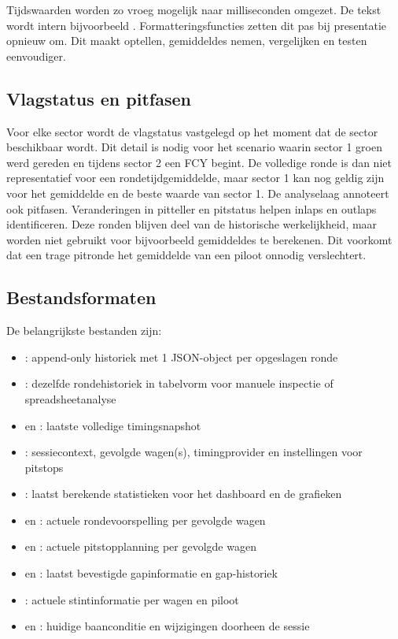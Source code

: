 Tijdswaarden worden zo vroeg mogelijk naar milliseconden omgezet. De tekst  wordt
intern bijvoorbeeld . Formatteringsfuncties zetten dit pas bij presentatie
opnieuw om. Dit maakt optellen, gemiddeldes nemen, vergelijken en testen eenvoudiger.

\subsection{Vlagstatus en pitfasen}
Voor elke sector wordt de vlagstatus vastgelegd op het moment dat de sector beschikbaar wordt. Dit
detail is nodig voor het scenario waarin sector 1 groen werd gereden en tijdens sector 2 een FCY
begint. De volledige ronde is dan niet representatief voor een rondetijdgemiddelde, maar sector 1
kan nog geldig zijn voor het gemiddelde en de beste waarde van sector 1.
De analyselaag annoteert ook pitfasen. Veranderingen in pitteller en pitstatus helpen inlaps en
outlaps identificeren. Deze ronden blijven deel van de historische werkelijkheid, maar worden niet
gebruikt voor bijvoorbeeld gemiddeldes te berekenen. Dit voorkomt dat een trage pitronde het gemiddelde van een
piloot onnodig verslechtert.

\subsection{Bestandsformaten}
De belangrijkste bestanden zijn:

\begin{itemize}
  \item {}: append-only historiek met 1 JSON-object per opgeslagen ronde
  \item {}: dezelfde rondehistoriek in tabelvorm voor manuele inspectie of spreadsheetanalyse
  \item {} en : laatste volledige timingsnapshot
  \item {}: sessiecontext, gevolgde wagen(s), timingprovider en instellingen voor pitstops
  \item {}: laatst berekende statistieken voor het dashboard en de grafieken
  \item {} en : actuele rondevoorspelling per gevolgde wagen
  \item {} en : actuele pitstopplanning per gevolgde wagen
  \item {} en : laatst bevestigde gapinformatie en gap-historiek
  \item {}: actuele stintinformatie per wagen en piloot
  \item {} en : huidige baanconditie en wijzigingen doorheen de sessie
\end{itemize}

